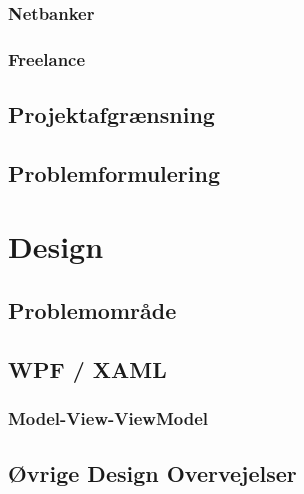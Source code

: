 \subsection{Netbanker}

\subsection{Freelance}


\section{Projektafgrænsning}


\section{Problemformulering}


\chapter{Design}


\section{Problemområde}


\section{WPF / XAML}

\subsection{Model-View-ViewModel}


\section{Øvrige Design Overvejelser}





